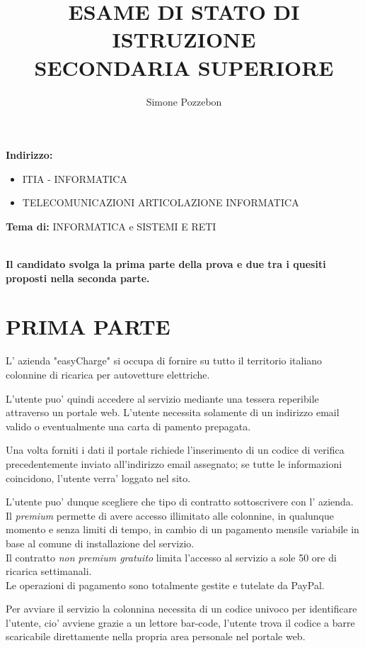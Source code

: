 \documentclass[a4paper,12pt]{article}
\author{Simone Pozzebon}
\date{}
\title{ESAME DI STATO DI ISTRUZIONE \\ SECONDARIA SUPERIORE}
\begin{document}
\maketitle
\newpage
\textbf{Indirizzo:}
\begin{itemize}
\item [] ITIA - INFORMATICA 
\item [] TELECOMUNICAZIONI ARTICOLAZIONE INFORMATICA
\end{itemize}

\textbf{Tema di:} INFORMATICA e SISTEMI E RETI \\ \\
\begin{center}
\textbf{Il candidato svolga la prima parte della prova e due tra i quesiti
proposti nella seconda parte.}
\end{center}

\section{\textbf{PRIMA PARTE}}
L' azienda "easyCharge" si occupa di fornire su tutto il territorio italiano
colonnine di ricarica per autovetture elettriche. 

L'utente puo' quindi accedere al servizio mediante una tessera reperibile
attraverso un portale web. L'utente necessita solamente di un indirizzo 
email valido o eventualmente una carta di pamento prepagata.

Una volta forniti i dati il portale richiede l'inserimento di un codice di 
verifica precedentemente inviato all'indirizzo email assegnato; se tutte le 
informazioni coincidono, l'utente verra' loggato nel sito. 

L'utente puo' dunque scegliere che tipo di contratto sottoscrivere con l'
azienda. Il \textit{premium} permette di avere accesso illimitato alle colonnine,
in qualunque momento e senza limiti di tempo, in cambio di un pagamento
mensile variabile in base al comune di installazione del servizio. \\
Il contratto \textit{non premium gratuito} limita l'accesso al servizio a sole
50 ore di ricarica settimanali. \\
Le operazioni di pagamento sono totalmente gestite e 
tutelate da PayPal.

Per avviare il servizio la colonnina necessita di un codice univoco per 
identificare l'utente, cio' avviene grazie a un lettore bar-code, l'utente 
trova il codice a barre scaricabile direttamente nella propria area personale nel 
portale web.
\end{document}
